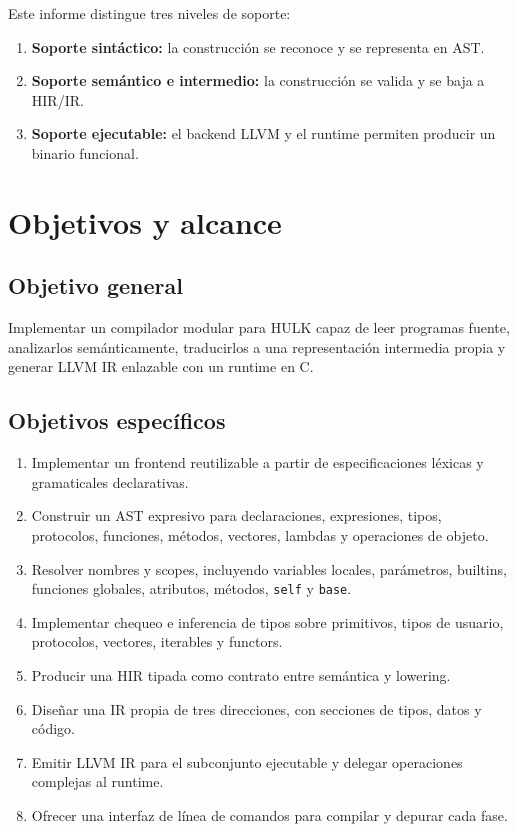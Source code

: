 \documentclass[12pt,letterpaper]{article}
\newcommand{\hulk}{\textsc{HULK}}
\newcommand{\src}[1]{\texttt{#1}}
\begin{document}
Este informe distingue tres niveles de soporte:

\begin{enumerate}[label=\arabic*.]
    \item \textbf{Soporte sintáctico:} la construcción se reconoce y se representa en AST.
    \item \textbf{Soporte semántico e intermedio:} la construcción se valida y se baja a HIR/IR.
    \item \textbf{Soporte ejecutable:} el backend LLVM y el runtime permiten producir un binario funcional.
\end{enumerate}

\section{Objetivos y alcance}

\subsection{Objetivo general}

Implementar un compilador modular para \hulk{} capaz de leer programas fuente, analizarlos semánticamente, traducirlos a una representación intermedia propia y generar LLVM IR enlazable con un runtime en C.

\subsection{Objetivos específicos}

\begin{enumerate}[label=\arabic*.]
    \item Implementar un frontend reutilizable a partir de especificaciones léxicas y gramaticales declarativas.
    \item Construir un AST expresivo para declaraciones, expresiones, tipos, protocolos, funciones, métodos, vectores, lambdas y operaciones de objeto.
    \item Resolver nombres y scopes, incluyendo variables locales, parámetros, builtins, funciones globales, atributos, métodos, \src{self} y \src{base}.
    \item Implementar chequeo e inferencia de tipos sobre primitivos, tipos de usuario, protocolos, vectores, iterables y functors.
    \item Producir una HIR tipada como contrato entre semántica y lowering.
    \item Diseñar una IR propia de tres direcciones, con secciones de tipos, datos y código.
    \item Emitir LLVM IR para el subconjunto ejecutable y delegar operaciones complejas al runtime.
    \item Ofrecer una interfaz de línea de comandos para compilar y depurar cada fase.
\end{enumerate}
\end{document}
